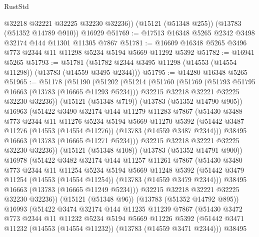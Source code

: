 \begin{lexlean}{RustStd}
\begin{coremodule}
        @32218
        @32221
        @32225
        @32230
        @32236))
    (@15121 (@51348 @255))
    (@13783 (@51352 @14789 @910))
    @16929
@51769 := @17513 @16348 @5265 @2342 @3498 @32174 @144 @11301 @11305 @7867
@51781 := @16609 @16348 @5265 @3496 @773 @2344 @11 @11298 @5234 @5194 @5669 @11292 @5392
@51782 := @16941 @5265
@51793 := @51781 (@51782 @2344 @3495 @11298 (@14553 (@14554 @11298)) (@13783 (@14559 @3495 @2344)))
@51795 := @14280 @16348 @5265
@51965 := @51178
    (@51190
      (@51202
        (@51214
          (@51760
            (@51769
              (@51793 @51795 @16663 (@13783 (@16665 @11293 @5234)))
              @32215
              @32218
              @32221
              @32225
              @32230
              @32236))
          (@15121 (@51348 @719))
          (@13783 (@51352 @14790 @905))
          @16963
          (@51422
            @3490
            @32174
            @144
            @11279
            @11283
            @7867
            (@51430
              @3488
              @773
              @2344
              @11
              @11276
              @5234
              @5194
              @5669
              @11270
              @5392
              (@51442 @3487 @11276 (@14553 (@14554 @11276)) (@13783 (@14559 @3487 @2344)))
              @38495
              @16663
              (@13783 (@16665 @11271 @5234)))
            @32215
            @32218
            @32221
            @32225
            @32230
            @32236))
        (@15121 (@51348 @108))
        (@13783 (@51352 @14791 @900))
        @16978
        (@51422
          @3482
          @32174
          @144
          @11257
          @11261
          @7867
          (@51430
            @3480
            @773
            @2344
            @11
            @11254
            @5234
            @5194
            @5669
            @11248
            @5392
            (@51442 @3479 @11254 (@14553 (@14554 @11254)) (@13783 (@14559 @3479 @2344)))
            @38495
            @16663
            (@13783 (@16665 @11249 @5234)))
          @32215
          @32218
          @32221
          @32225
          @32230
          @32236))
      (@15121 (@51348 @96))
      (@13783 (@51352 @14792 @895))
      @16993
      (@51422
        @3474
        @32174
        @144
        @11235
        @11239
        @7867
        (@51430
          @3472
          @773
          @2344
          @11
          @11232
          @5234
          @5194
          @5669
          @11226
          @5392
          (@51442 @3471 @11232 (@14553 (@14554 @11232)) (@13783 (@14559 @3471 @2344)))
          @38495

\end{coremodule}
\end{lexlean}
